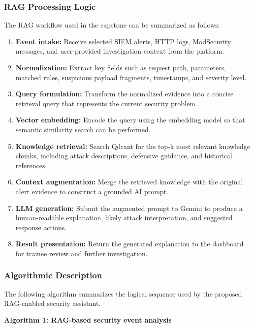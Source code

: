 \subsubsection{RAG Processing Logic}
The RAG workflow used in the capstone can be summarized as follows:

\begin{enumerate}
	\item \textbf{Event intake:} Receive selected SIEM alerts, HTTP logs, ModSecurity messages, and user-provided investigation context from the platform.
	\item \textbf{Normalization:} Extract key fields such as request path, parameters, matched rules, suspicious payload fragments, timestamps, and severity level.
	\item \textbf{Query formulation:} Transform the normalized evidence into a concise retrieval query that represents the current security problem.
	\item \textbf{Vector embedding:} Encode the query using the embedding model so that semantic similarity search can be performed.
	\item \textbf{Knowledge retrieval:} Search Qdrant for the top-k most relevant knowledge chunks, including attack descriptions, defensive guidance, and historical references.
	\item \textbf{Context augmentation:} Merge the retrieved knowledge with the original alert evidence to construct a grounded AI prompt.
	\item \textbf{LLM generation:} Submit the augmented prompt to Gemini to produce a human-readable explanation, likely attack interpretation, and suggested response actions.
	\item \textbf{Result presentation:} Return the generated explanation to the dashboard for trainee review and further investigation.
\end{enumerate}

\subsubsection{Algorithmic Description}
The following algorithm summarizes the logical sequence used by the proposed RAG-enabled security assistant.

\noindent\textbf{Algorithm 1: RAG-based security event analysis}

